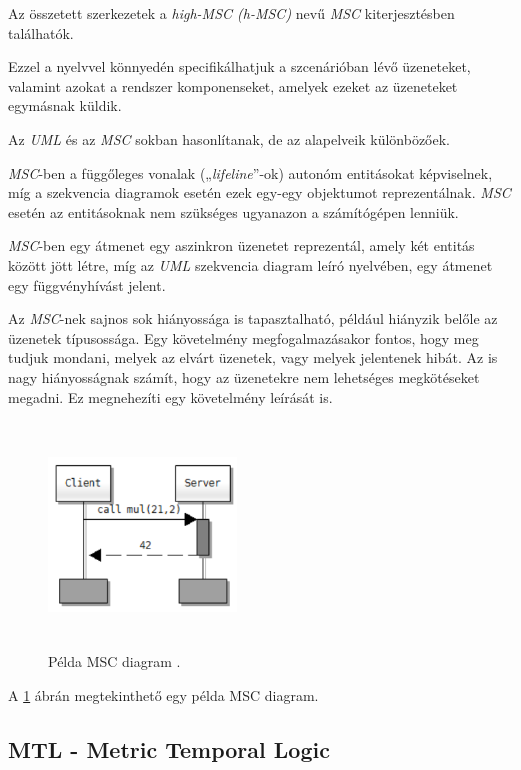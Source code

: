 Az összetett szerkezetek a \textit{high-MSC (h-MSC)} \cite{MSC1} nevű \textit{MSC} kiterjesztésben találhatók.

Ezzel a nyelvvel könnyedén specifikálhatjuk a szcenárióban lévő üzeneteket, valamint azokat a rendszer komponenseket, amelyek ezeket az üzeneteket egymásnak küldik.

Az \textit{UML} és az \textit{MSC} sokban hasonlítanak, de az alapelveik különbözőek.

\textit{MSC}-ben a függőleges vonalak („\textit{lifeline}”-ok) autonóm entitásokat képviselnek, míg a szekvencia diagramok esetén ezek egy-egy objektumot reprezentálnak.
\textit{MSC} esetén az entitásoknak nem szükséges ugyanazon a számítógépen lenniük.

\textit{MSC}-ben egy átmenet egy aszinkron üzenetet reprezentál, amely két entitás között jött létre, míg az \textit{UML} szekvencia diagram leíró nyelvében, egy átmenet egy függvényhívást jelent.

Az \textit{MSC}-nek sajnos sok hiányossága is tapasztalható, például hiányzik belőle az üzenetek típusossága.
Egy követelmény megfogalmazásakor fontos, hogy meg tudjuk mondani, melyek az elvárt üzenetek, vagy melyek jelentenek hibát.
Az is nagy hiányosságnak számít, hogy az üzenetekre nem lehetséges megkötéseket megadni.
Ez megnehezíti egy követelmény leírását is.

\begin{figure}[!ht]
    \centering
    \includegraphics[width=50mm, height=6cm, keepaspectratio]{figures/msc_example.png}
    \caption{Példa MSC diagram \cite{MSC1}.}
    \label{msc_example}
\end{figure}

A \ref{msc_example} ábrán megtekinthető egy példa MSC diagram.

\subsection{MTL - Metric Temporal Logic}

